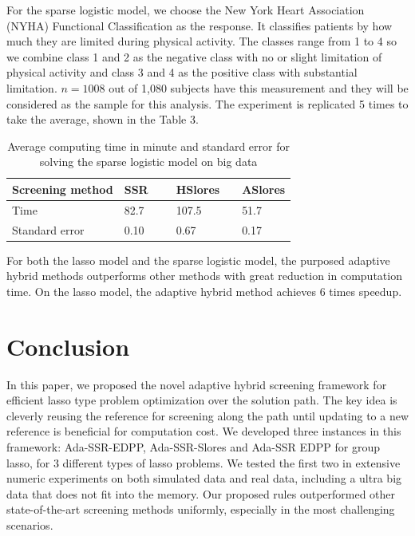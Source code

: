 For the sparse logistic model, we choose the New York Heart Association (NYHA) Functional Classification as the response. It classifies patients by how much they are limited during physical activity. The classes range from 1 to 4 so we combine class 1 and 2 as the negative class with no or slight limitation of physical activity and class 3 and 4 as the positive class with substantial limitation. $n=1008$ out of 1,080 subjects have this measurement and they will be considered as the sample for this analysis. The experiment is replicated 5 times to take the average, shown in the Table 3.

\begin{table}[H]
\centering
\begin{tabular}{l|l|l|l}
\hline

Screening method & SSR\,\,\,\,\,\,\,\,\,    & HSlores\,\,\,\,\,\,   & ASlores   \\
\hline
Time & 82.7 & 107.5 & 51.7 \\
Standard error & 0.10 & 0.67 & 0.17 
 \\\hline
\end{tabular}
\caption{Average computing time in minute and standard error for solving the sparse logistic model on big data}
\end{table}

For both the lasso model and the sparse logistic model, the purposed adaptive hybrid methods outperforms other methods with great reduction in computation time. On the lasso model, the adaptive hybrid method achieves 6 times speedup.

\section{Conclusion}
\label{sec:6}

In this paper, we proposed the novel adaptive hybrid screening framework for efficient lasso type problem optimization over the solution path. The key idea is cleverly reusing the reference for screening along the path until updating to a new reference is beneficial for computation cost.  We developed three instances in this framework: Ada-SSR-EDPP, Ada-SSR-Slores and Ada-SSR EDPP for group lasso, for 3 different types of lasso problems. We tested the first two in extensive numeric experiments on both simulated data and real data, including a ultra big data that does not fit into the memory. Our proposed rules outperformed other state-of-the-art screening methods uniformly, especially in the most challenging scenarios. 

